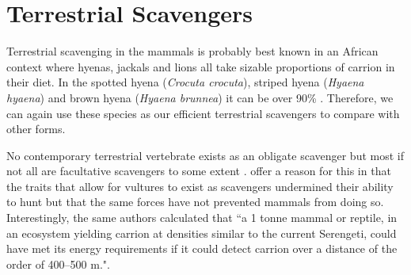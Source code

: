 \documentclass[a4paper,12pt]{article}
\begin{document}


















 


 


\section*{Terrestrial Scavengers}
Terrestrial scavenging in the mammals is probably best known in an African context where hyenas, jackals and lions all take sizable proportions of carrion in their diet.
In the spotted hyena (\textit{Crocuta crocuta}), striped hyena (\textit{Hyaena hyaena}) and brown hyena (\textit{Hyaena brunnea}) it can be over 90\% \citep{jones2015african}.
Therefore, we can again use these species as our efficient terrestrial scavengers to compare with other forms. 

No contemporary terrestrial vertebrate exists as an obligate scavenger but most if not all are facultative scavengers to some extent \citep{beasley2015vertebrates}.
\cite{ruxton2004obligate} offer a reason for this in that the traits that allow for vultures to exist as scavengers undermined their ability to hunt but that the same forces have not prevented mammals from doing so.
Interestingly, the same authors calculated that ``a 1 tonne mammal or reptile, in an ecosystem yielding carrion at densities similar to the current Serengeti, could have met its energy requirements if it could detect carrion over a distance of the order of 400–500 m."\citep{ruxton2004obligate}.
\end{document}
